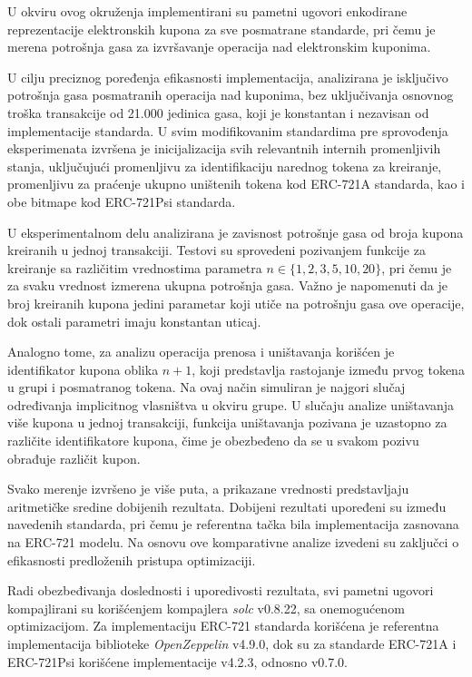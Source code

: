 U okviru ovog okruženja implementirani su pametni ugovori enkodirane reprezentacije elektronskih kupona za sve posmatrane standarde, pri čemu je merena potrošnja gasa za izvršavanje operacija nad elektronskim kuponima.

U cilju preciznog poređenja efikasnosti implementacija, analizirana je isključivo potrošnja gasa posmatranih operacija nad kuponima, bez uključivanja osnovnog troška transakcije od 21.000 jedinica gasa, koji je konstantan i nezavisan od implementacije standarda. U svim modifikovanim standardima pre sprovođenja eksperimenata izvršena je inicijalizacija svih relevantnih internih promenljivih stanja, uključujući promenljivu za identifikaciju narednog tokena za kreiranje, promenljivu za praćenje ukupno uništenih tokena kod ERC-721A standarda, kao i obe bitmape kod ERC-721Psi standarda.

U eksperimentalnom delu analizirana je zavisnost potrošnje gasa od broja kupona kreiranih u jednoj transakciji. Testovi su sprovedeni pozivanjem funkcije za kreiranje sa različitim vrednostima parametra $n \in \{1, 2, 3, 5, 10, 20\}$, pri čemu je za svaku vrednost izmerena ukupna potrošnja gasa. Važno je napomenuti da je broj kreiranih kupona jedini parametar koji utiče na potrošnju gasa ove operacije, dok ostali parametri imaju konstantan uticaj.

Analogno tome, za analizu operacija prenosa i uništavanja korišćen je identifikator kupona oblika $n+1$, koji predstavlja rastojanje između prvog tokena u grupi i posmatranog tokena. Na ovaj način simuliran je najgori slučaj određivanja implicitnog vlasništva u okviru grupe. U slučaju analize uništavanja više kupona u jednoj transakciji, funkcija uništavanja pozivana je uzastopno za različite identifikatore kupona, čime je obezbeđeno da se u svakom pozivu obrađuje različit kupon.

Svako merenje izvršeno je više puta, a prikazane vrednosti predstavljaju aritmetičke sredine dobijenih rezultata. Dobijeni rezultati upoređeni su između navedenih standarda, pri čemu je referentna tačka bila implementacija zasnovana na ERC-721 modelu. Na osnovu ove komparativne analize izvedeni su zaključci o efikasnosti predloženih pristupa optimizaciji.

Radi obezbeđivanja doslednosti i uporedivosti rezultata, svi pametni ugovori kompajlirani su korišćenjem kompajlera \textit{solc} v0.8.22, sa onemogućenom optimizacijom. Za implementaciju ERC-721 standarda korišćena je referentna implementacija biblioteke \textit{OpenZeppelin} v4.9.0, dok su za standarde ERC-721A i ERC-721Psi korišćene implementacije v4.2.3, odnosno v0.7.0.


